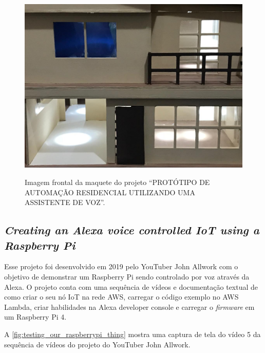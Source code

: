 \begin{figure}[htbp]
	\centering
	\caption{Imagem frontal da maquete do projeto ``PROTÓTIPO DE AUTOMAÇÃO RESIDENCIAL UTILIZANDO UMA ASSISTENTE DE VOZ''.}
	\includegraphics[scale=0.4]{Imagens/maquete_leandro_dallarosa.png}
	\label{fig:maquete_leandro_dallarosa}
\end{figure}

\subsection{\textit{Creating an Alexa voice controlled IoT using a Raspberry Pi}}\label{subsection:creating_an_alexa_voice_controlled_iot_using_a_raspberry_pi}

Esse projeto foi desenvolvido em 2019 pelo YouTuber John Allwork com o objetivo de demonstrar um Raspberry Pi sendo controlado por voz através da Alexa. O projeto conta com uma sequência de vídeos e documentação textual de como criar o seu nó IoT na rede AWS, carregar o código exemplo no AWS Lambda, criar habilidades na Alexa developer console e carregar o \textit{firmware} em um Raspberry Pi 4.

A \autoref{fig:testing_our_raspberrypi_thing} mostra uma captura de tela do vídeo 5 da sequência de vídeos do projeto do YouTuber John Allwork.

